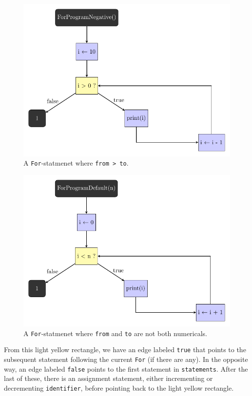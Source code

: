 \begin{figure}[ht!]
    \centering
    \includegraphics[scale=.58]{assets/chapter4/ForProgramNegative_ibp.pdf}
    \caption{A \texttt{For}-statmenet where \texttt{from > to}.}
    \label{forExample2}
\end{figure}

\begin{figure}[ht!]
    \centering
    \includegraphics[scale=.58]{assets/chapter4/ForProgramDefault_ibp.pdf}
    \caption{A \texttt{For}-statmenet where \texttt{from} and \texttt{to} are not both numericals.}
    \label{forExample3}
\end{figure}

From this light yellow rectangle, we have an edge labeled \texttt{true} that points to the subsequent statement following the current \texttt{For} (if there are any). In the opposite way, an edge labeled \texttt{false} points to the first statement in \texttt{statements}. After the last of these, there is an assignment statement, either incrementing or decrementing \texttt{identifier}, before pointing back to the light yellow rectangle. \\

